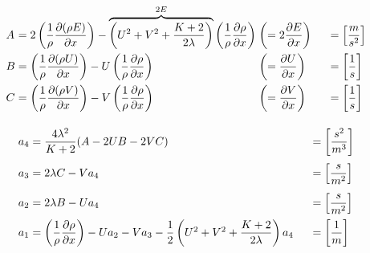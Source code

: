 \documentclass[
	pdftex,             %
	12pt,				%
	a4paper,		   	%
	english,				%
	oneside,			%
]{article}
\begin{document}
\begin{eqnarray}
\begin{split}
\arraycolsep=1.4pt\def\arraystretch{2.2}
\begin{array}{lclll}
A &=& 2 \left( \dfrac{1}{\rho}\dfrac{\partial (\rho E)}{\partial x} \right)
  - \overbrace{ \left( U^2 + V^2 + \dfrac{K+2}{2\lambda} \right) }^{2E}
  \left( \dfrac{1}{\rho}\dfrac{\partial\rho}{\partial x} \right)
    &\left( = 2 \dfrac{\partial E}{\partial x} \right)
    & \hspace{0.5cm} = \left[\dfrac{m}{s^2} \right]
\\
B &=& \left( \dfrac{1}{\rho}\dfrac{\partial (\rho U)}{\partial x} \right)
   - U\left(\dfrac{1}{\rho}\dfrac{\partial \rho}{\partial x} \right)
	&\left( = \dfrac{\partial U}{\partial x} \right)
    & \hspace{0.5cm} = \left[\dfrac{1}{s} \right]
\\
C &=& \left( \dfrac{1}{\rho}\dfrac{\partial (\rho V)}{\partial x} \right)
   - V\left( \dfrac{1}{\rho}\dfrac{\partial \rho}{\partial x} \right)
	&\left( = \dfrac{\partial V}{\partial x} \right)
    & \hspace{0.5cm} = \left[\dfrac{1}{s} \right]
\end{array}
\end{split}
\end{eqnarray}

\begin{eqnarray}
\begin{split}
\arraycolsep=1.4pt\def\arraystretch{2.2}
\begin{array}{lcll}
a_4 &=& \dfrac{4 \lambda^2}{K+2} ( A - 2 U B - 2 V C )
    & \hspace{0.5cm} = \left[\dfrac{s^2}{m^3} \right]
\\
a_3 &=& 2 \lambda C - V a_4
    & \hspace{0.5cm} = \left[\dfrac{s}{m^2} \right]
\\
a_2 &=& 2 \lambda B - U a_4
    & \hspace{0.5cm} = \left[\dfrac{s}{m^2} \right]
\\
a_1 &=& \left( \dfrac{1}{\rho} \dfrac{\partial \rho}{\partial x} \right)
     - U a_2 - V a_3 - \dfrac{1}{2} \left( U^2 + V^2 + \dfrac{K+2}{2\lambda} \right) a_4
    & \hspace{0.5cm} = \left[\dfrac{1}{m} \right]
\end{array}
\end{split}
\end{eqnarray}
\end{document}
